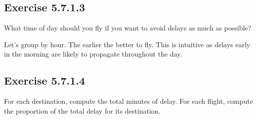 \documentclass[]{book}
\newenvironment{Shaded}{\begin{snugshade}}{\end{snugshade}}
\newcommand{\CommentTok}[1]{\textcolor[rgb]{0.56,0.35,0.01}{\textit{#1}}}
\newcommand{\DataTypeTok}[1]{\textcolor[rgb]{0.13,0.29,0.53}{#1}}
\newcommand{\KeywordTok}[1]{\textcolor[rgb]{0.13,0.29,0.53}{\textbf{#1}}}
\newcommand{\NormalTok}[1]{#1}
\newcommand{\OperatorTok}[1]{\textcolor[rgb]{0.81,0.36,0.00}{\textbf{#1}}}
\newcommand{\OtherTok}[1]{\textcolor[rgb]{0.56,0.35,0.01}{#1}}
\newcommand{\StringTok}[1]{\textcolor[rgb]{0.31,0.60,0.02}{#1}}
\theoremstyle{plain}
\theoremstyle{remark}
\begin{document}
\hypertarget{exercise-5.7.1.3}{%
\subsection*{\texorpdfstring{Exercise
{5.7.1.3}}{Exercise 5.7.1.3}}\label{exercise-5.7.1.3}}

What time of day should you fly if you want to avoid delays as much as
possible?

Let's group by hour. The earlier the better to fly. This is intuitive as
delays early in the morning are likely to propagate throughout the day.

\begin{Shaded}
\end{Shaded}

\hypertarget{exercise-5.7.1.4}{%
\subsection*{\texorpdfstring{Exercise
{5.7.1.4}}{Exercise 5.7.1.4}}\label{exercise-5.7.1.4}}

For each destination, compute the total minutes of delay. For each
flight, compute the proportion of the total delay for its destination.
\end{document}
